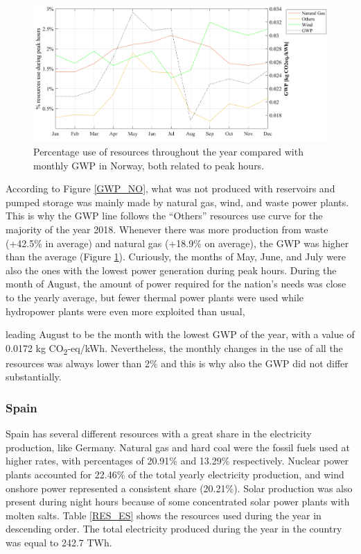 {{\begin{figure}[htbp]
	\centering
	\includegraphics[width=1\textwidth]{ChapterLCA/Images/GWP_plots/Comp_GWP_NO.png}
	\caption{Percentage use of resources throughout the year compared with monthly GWP in Norway, both related to peak hours.}
	\label{COMP_NO}
\end{figure}

According to Figure \ref{GWP_NO}, what was not produced with reservoirs and pumped storage was mainly  made by natural gas, wind, and waste power plants. This is why the GWP line follows the ``Others'' resources use curve for the majority of the year 2018. Whenever there was more production from waste {(+42.5\% in average)} and natural gas {(+18.9\% on average)}, the GWP was higher than the average (Figure \ref{COMP_NO}). {Curiously, the months of May, June, and July were also the ones with the lowest power generation during peak hours.} During the month of August, the amount of power required for the nation's needs was close to the yearly average, but fewer thermal power plants were used while hydropower plants were even more exploited than usual, {leading August to be the month with the lowest GWP of the year, with a value of 0.0172 kg CO\textsubscript2-eq/kWh. %
 Nevertheless, the monthly changes in the use of all the resources was always lower than 2\% and this is why also the GWP did not differ substantially. 

\subsubsection{Spain}

Spain has several different resources with a great share in the electricity production, like Germany.
 Natural gas and hard coal were the fossil fuels used at higher rates, with percentages of 20.91\% and 13.29\% respectively. Nuclear power plants accounted for 22.46\% of the total yearly electricity production, and  wind onshore power represented a consistent share (20.21\%).  Solar production was also present  during night hours because of some concentrated solar power plants with molten salts. Table \ref{RES_ES} shows the resources used during the year in descending order. The total electricity produced during the year in the country was equal to 242.7 TWh.

}}}
